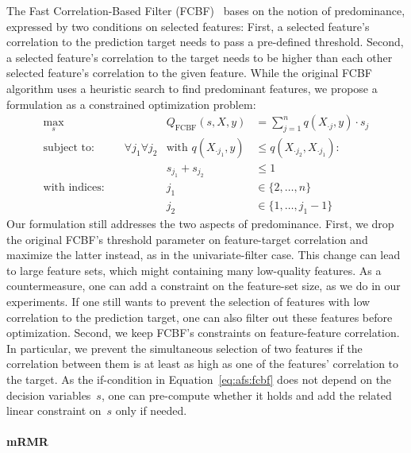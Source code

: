 \documentclass{article}
\theoremstyle{definition}
\begin{document}
The Fast Correlation-Based Filter (FCBF)~\cite{yu2003feature} bases on the notion of predominance, expressed by two conditions on selected features:
First, a selected feature's correlation to the prediction target needs to pass a pre-defined threshold.
Second, a selected feature's correlation to the target needs to be higher than each other selected feature's correlation to the given feature.
While the original FCBF algorithm uses a heuristic search to find predominant features, we propose a formulation as a constrained optimization problem:
%
\begin{equation}
	\begin{aligned}
		\max_s &\quad & Q_{\text{FCBF}}(s,X,y) &= \sum_{j=1}^{n} q(X_{\cdot{}j},y) \cdot s_j \\
		\text{subject to:} &\quad \forall j_1 \forall j_2 & \text{with } q(X_{\cdot{}j_1},y) &\leq q(X_{\cdot{}j_2}, X_{\cdot{}j_1}): \\
		&\quad & s_{j_1} + s_{j_2} &\leq 1 \\
		\text{with indices:} &\quad & j_1 &\in \{2, \dots, n\} \\
		&\quad & j_2 &\in \{1, \dots, j_1 - 1\}
	\end{aligned}
	\label{eq:afs:fcbf}
\end{equation}
%
Our formulation still addresses the two aspects of predominance.
First, we drop the original FCBF's threshold parameter on feature-target correlation and maximize the latter instead, as in the univariate-filter case.
This change can lead to large feature sets, which might containing many low-quality features.
As a countermeasure, one can add a constraint on the feature-set size, as we do in our experiments.
If one still wants to prevent the selection of features with low correlation to the prediction target, one can also filter out these features before optimization.
Second, we keep FCBF's constraints on feature-feature correlation.
In particular, we prevent the simultaneous selection of two features if the correlation between them is at least as high as one of the features' correlation to the target.
As the if-condition in Equation~\ref{eq:afs:fcbf} does not depend on the decision variables~$s$, one can pre-compute whether it holds and add the related linear constraint on~$s$ only if needed.

\paragraph{mRMR}
\end{document}
